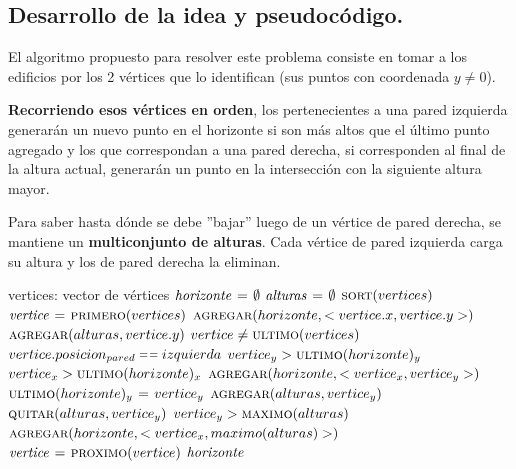 \newpage


\subsection{Desarrollo de la idea y pseudocódigo.}

\vspace*{0.3cm}

El algoritmo propuesto para resolver este problema consiste en tomar a los edificios
por los 2 vértices que lo identifican (sus puntos con coordenada $y \neq 0$).

\textbf{Recorriendo esos vértices en orden}, los pertenecientes a una pared izquierda
generarán un nuevo punto en el horizonte si son más altos que el último punto agregado
y los que correspondan a una pared derecha, si corresponden al final de la
altura actual, generarán un punto en la intersección con la siguiente altura mayor.

Para saber hasta dónde se debe ''bajar'' luego de un vértice de pared derecha, se
mantiene un \textbf{multiconjunto de alturas}. Cada vértice de pared izquierda carga su
altura y los de pared derecha la eliminan.

\begin{codebox}
\li \Comment vertices: vector de vértices
\li $\id{horizonte} \gets \emptyset$
\li $\id{alturas} \gets \emptyset$
\li $\textnormal{\scshape sort}(vertices)$
\li $\id{vertice} \gets \proc{primero}(vertices)$
\li $\textnormal{\scshape agregar}(horizonte, <vertice.x, vertice.y>)$
\li $\textnormal{\scshape agregar}(alturas, vertice.y)$
\li \While $vertice \neq \textnormal{\scshape ultimo}(vertices)$
      \Do
\li     \If $vertice.posicion_{pared} \isequal izquierda$
          \Then
\li         \If $vertice_y > \textnormal{\scshape ultimo}(horizonte)_y$
              \Then
\li             \If $vertice_x > \textnormal{\scshape ultimo}(horizonte)_x$
                  \Then
\li                 $\textnormal{\scshape agregar}(horizonte, <vertice_x, vertice_y>)$
\li               \Else
\li                 $\textnormal{\scshape ultimo}(horizonte)_y \mathrel{\hspace{1pt}=\hspace{1pt}} vertice_y$
                 \End
              \End
\li         $\textnormal{\scshape agregar}(alturas, vertice_y)$
\li       \Else
\li         $\textnormal{\scshape quitar}(alturas, vertice_y)$
\li         \If $vertice_y > \textnormal{\scshape maximo}(alturas)$
              \Then
\li             $\textnormal{\scshape agregar}(horizonte, <vertice_x, maximo(alturas)>)$
              \End
          \End
\li     $\id{vertice} \gets \proc{proximo}(vertice)$
      \End
\li \Return $\id{horizonte}$
\end{codebox}



